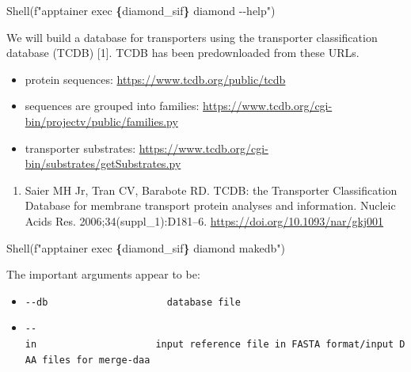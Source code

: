 \documentclass[
]{book}
\newenvironment{Shaded}{\begin{snugshade}}{\end{snugshade}}
\newcommand{\NormalTok}[1]{#1}
\newcommand{\SpecialCharTok}[1]{\textcolor[rgb]{0.81,0.36,0.00}{\textbf{#1}}}
\newcommand{\SpecialStringTok}[1]{\textcolor[rgb]{0.31,0.60,0.02}{#1}}
\providecommand{\tightlist}{%
  \setlength{\itemsep}{0pt}\setlength{\parskip}{0pt}}
\begin{document}
\begin{Shaded}
\begin{Highlighting}[numbers=left,,]
\NormalTok{Shell(}\SpecialStringTok{f"apptainer exec }\SpecialCharTok{\{}\NormalTok{diamond\_sif}\SpecialCharTok{\}}\SpecialStringTok{ diamond {-}{-}help"}\NormalTok{)}
\end{Highlighting}
\end{Shaded}

We will build a database for transporters using the transporter classification database (TCDB) {[}1{]}.
TCDB has been predownloaded from these URLs.

\begin{itemize}
\tightlist
\item
  protein sequences: \url{https://www.tcdb.org/public/tcdb}
\item
  sequences are grouped into families: \url{https://www.tcdb.org/cgi-bin/projectv/public/families.py}
\item
  transporter substrates: \url{https://www.tcdb.org/cgi-bin/substrates/getSubstrates.py}
\end{itemize}

\begin{enumerate}
\def\labelenumi{\arabic{enumi}.}
\tightlist
\item
  Saier MH Jr, Tran CV, Barabote RD. TCDB: the Transporter Classification Database for membrane transport protein analyses and information. Nucleic Acids Res. 2006;34(suppl\_1):D181--6. \url{https://doi.org/10.1093/nar/gkj001}
\end{enumerate}

\begin{Shaded}
\begin{Highlighting}[numbers=left,,]
\NormalTok{Shell(}\SpecialStringTok{f"apptainer exec }\SpecialCharTok{\{}\NormalTok{diamond\_sif}\SpecialCharTok{\}}\SpecialStringTok{ diamond makedb"}\NormalTok{)}
\end{Highlighting}
\end{Shaded}

The important arguments appear to be:

\begin{itemize}
\tightlist
\item
  \texttt{-\/-db\ \ \ \ \ \ \ \ \ \ \ \ \ \ \ \ \ \ \ \ \ database\ file}
\item
  \texttt{-\/-in\ \ \ \ \ \ \ \ \ \ \ \ \ \ \ \ \ \ \ \ \ input\ reference\ file\ in\ FASTA\ format/input\ DAA\ files\ for\ merge-daa}
\end{itemize}
\end{document}
